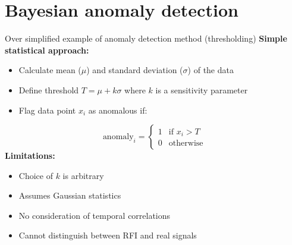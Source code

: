 \documentclass[aspectratio=169]{beamer}
\begin{document}
\section{Bayesian anomaly detection}

\begin{frame}{Over simplified example of anomaly detection method (thresholding)}
  \footnotesize
  \textbf{Simple statistical approach:}
  \begin{itemize}
    \item Calculate mean ($\mu$) and standard deviation ($\sigma$) of the data
    \item Define threshold $T = \mu + k\sigma$ where $k$ is a sensitivity parameter
    \item Flag data point $x_i$ as anomalous if:
  \end{itemize}
  \begin{equation}
    \text{anomaly}_i = \begin{cases}
      1 & \text{if } x_i > T \\
      0 & \text{otherwise}
    \end{cases}
  \end{equation}
  \textbf{Limitations:}
  \begin{itemize}
    \item Choice of $k$ is arbitrary
    \item Assumes Gaussian statistics
    \item No consideration of temporal correlations
    \item Cannot distinguish between RFI and real signals
  \end{itemize}
\end{frame}
\end{document}
